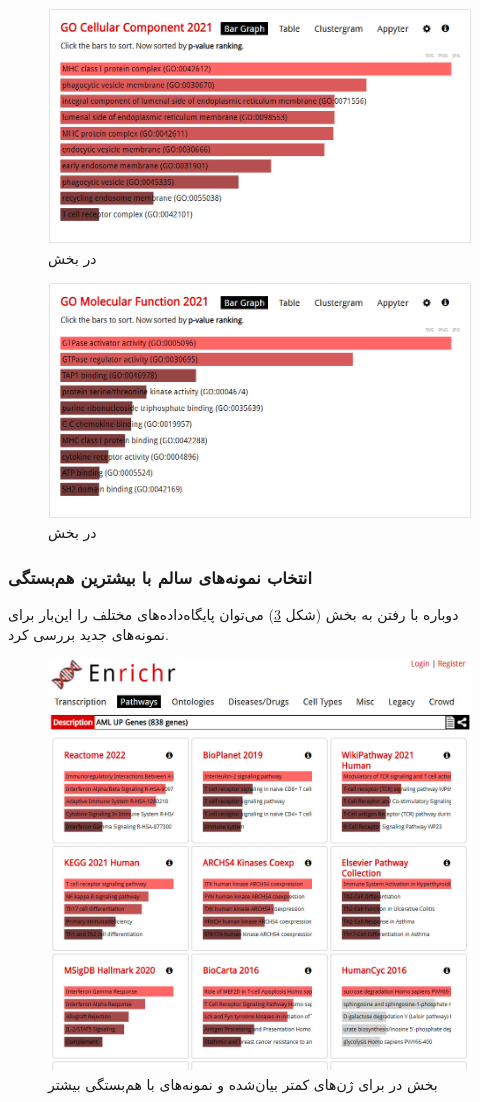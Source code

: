 \documentclass{article}
\begin{document}
\begin{figure}[h!]
	\centering
	\includegraphics[width=0.5\columnwidth]{figs/enrichr-ontologies-cc.jpg}
	\caption{ در بخش }
	\label{fig:enrichr-ontology-cc}
\end{figure}

\begin{figure}[h!]
	\centering
	\includegraphics[width=0.5\columnwidth]{figs/enrichr-ontologies-mf.jpg}
	\caption{ در بخش }
	\label{fig:enrichr-ontology-mf}
\end{figure}

\subsubsection{انتخاب نمونه‌های سالم با بیشترین هم‌بستگی}
دوباره با رفتن به بخش  (شکل \ref{fig:enrichr-pathways-2}) می‌توان پایگاه‌داده‌های  مختلف را این‌بار برای نمونه‌های جدید بررسی کرد.
\begin{figure}[h!]
	\centering
	\includegraphics[width=0.5\columnwidth]{figs/enrichr-pathways-2.jpg}
	\caption{بخش  در  برای ژن‌های کمتر بیان‌شده و نمونه‌های با هم‌بستگی بیشتر}
	\label{fig:enrichr-pathways-2}
\end{figure}
\end{document}
